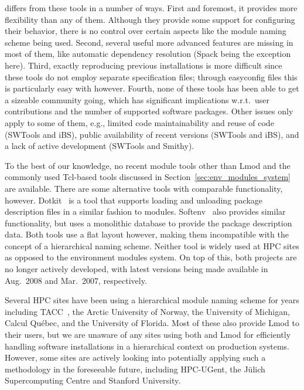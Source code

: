 \easybuild{} differs from these tools in a number of ways. First and foremost, it
provides more flexibility than any of them. Although they provide some support
for configuring their behavior, there is no control over certain aspects like the
module naming scheme being used. Second, several useful more advanced
features are missing in most of them, like automatic dependency resolution (Spack
being the exception here). Third, exactly reproducing previous installations is more
difficult since these tools do not employ separate specification files; through
easyconfig files this is particularly easy with \easybuild{} however.
Fourth, none of these tools has been able to get a sizeable community going, which
has significant implications w.r.t.\ user contributions and the number of supported
software packages.
Other issues only apply to some of them, e.g., limited code
maintainability and reuse of code (SWTools and iBS), public availability of recent
versions (SWTools and iBS), and a lack of active development (SWTools and Smithy).

To the best of our knowledge, no recent module tools other than Lmod and the commonly
used Tcl-based tools discussed in Section~\ref{sec:env_modules_system} are
available. There are some alternative tools with comparable functionality, however.
Dotkit~\cite{dotkit} is a tool that supports loading and unloading package description 
files in a similar fashion to modules. Softenv~\cite{softenv} also provides similar
functionality, but uses a monolithic database to provide the package description data.
Both tools use a flat layout however, making them incompatible with the concept of a
hierarchical naming scheme. Neither tool is widely used at HPC sites as
opposed to the environment modules system. On top of this, both projects are no longer
actively developed, with latest versions being made available in Aug.~2008 and
Mar.~2007, respectively.

Several HPC sites have been using a hierarchical module naming scheme for years
including TACC~\cite{lmodSC11}, the Arctic University of Norway, the University
of Michigan, Calcul Qu\'ebec, and the University of Florida. Most of these also provide
Lmod to their users, but we are unaware of any sites using both \easybuild{} and Lmod
for efficiently handling software installations in a hierarchical context on
production systems. However, some
sites are actively looking into potentially applying such a methodology in the
foreseeable future, including HPC-UGent, the J\"ulich Supercomputing Centre and
Stanford University.
